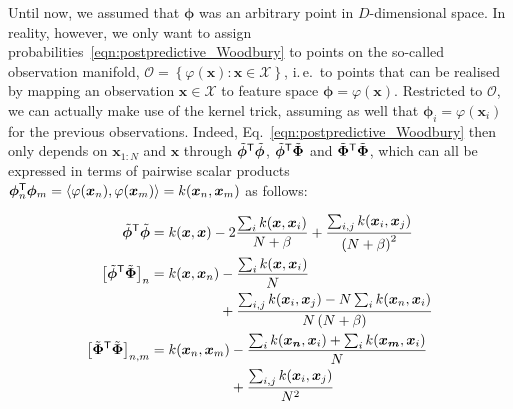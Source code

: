 \documentclass[twoside]{article}
\newcommand{\transpose}[1]{#1^{\mbox{\sf \scriptsize T}}}
\newcommand{\quadform}[2]{\transpose{#1}#2#1}
\newcommand{\meanconc}{\beta}
\newcommand{\ie}{i.\,e.\ }
\begin{document}
Until now, we assumed that $\bm{\phi}$ was an arbitrary point in $D$-dimensional space. In reality, however, we only want to assign probabilities~\eqref{eqn:postpredictive_Woodbury} to points on the so-called observation manifold, $\mathcal{O} = \left\{\varphi(\bm{x}) : \bm{x}\in\mathcal{X}\right\}$, \ie to points that can be realised by mapping an observation $\bm{x}\in\mathcal{X}$ to feature space $\bm{\phi} = \varphi(\bm{x})$. Restricted to $\mathcal{O}$, we can actually make use of the kernel trick, assuming as well that $\bm{\phi}_i=\varphi(\bm{x}_i)$ for the previous observations. Indeed, Eq.~\eqref{eqn:postpredictive_Woodbury} then only depends on $\bm{x}_{1:N}$ and $\bm{x}$ through $\quadform{\tilde{\bm{\phi}}}{}$, $\transpose{\tilde{\bm{\phi}}}\tilde{\bm{\Phi}}$ and $\quadform{\tilde{\bm{\Phi}}}{}$, which can all be expressed in terms of pairwise scalar products $\transpose{\bm{\phi}_n}\bm{\phi}_m = \langle\varphi(\bm{x}_n),\varphi(\bm{x}_m)\rangle = k(\bm{x}_n,\bm{x}_m)$ as follows:

\begin{align}
 \quadform{\tilde{\bm{\phi}}}{} &= k(\bm{x},\bm{x}) - 2\frac{\sum_i k(\bm{x},\bm{x}_i)}{N + \meanconc} + \frac{\sum_{i,j} k(\bm{x}_i,\bm{x}_j)}{\left(N + \meanconc\right)^{2}} \label{eqn:kernelexpressions} \\
 \left[\transpose{\tilde{\bm{\phi}}}\tilde{\bm{\Phi}}\right]_{n} &=
     \begin{aligned}[t]
     k(\bm{x},\bm{x}_n) &- \frac{\sum_i k(\bm{x},\bm{x}_i)}{N} \\
     &+ \frac{\sum_{i,j} k(\bm{x}_i,\bm{x}_j) - N\sum_i k(\bm{x}_n,\bm{x}_i)}{N\left(N+\meanconc\right)} \\
     \end{aligned} \notag \\
 \left[\quadform{\tilde{\bm{\Phi}}}{}\right]_{n,m} &=
    \begin{aligned}[t]
    k(\bm{x}_n,\bm{x}_m) &- \frac{\sum_i k(\bm{x_n},\bm{x}_i) + \sum_i k(\bm{x_m},\bm{x}_i)}{N} \\
    &+ \frac{\sum_{i,j} k(\bm{x}_i,\bm{x}_j)}{N^2}
    \end{aligned} \notag
\end{align}
\end{document}
